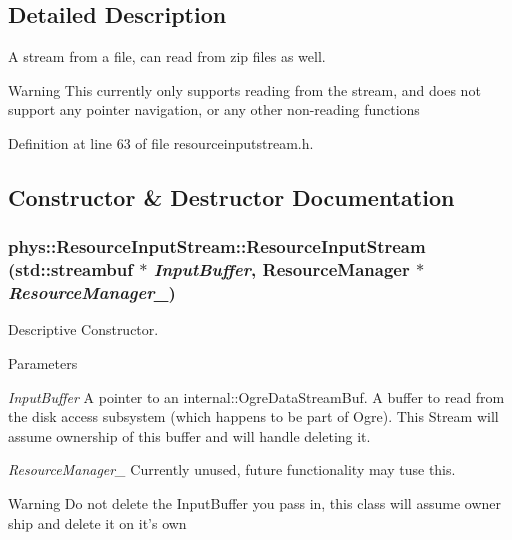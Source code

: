 \begin{DoxyCompactItemize}
\end{DoxyCompactItemize}


\subsection{Detailed Description}
A stream from a file, can read from zip files as well. \begin{DoxyWarning}{Warning}
This currently only supports reading from the stream, and does not support any pointer navigation, or any other non-\/reading functions 
\end{DoxyWarning}


Definition at line 63 of file resourceinputstream.h.



\subsection{Constructor \& Destructor Documentation}
\hypertarget{classphys_1_1ResourceInputStream_a890b739ac7f1c68108dc29f6887d2fa2}{
\subsubsection[{ResourceInputStream}]{\setlength{\rightskip}{0pt plus 5cm}phys::ResourceInputStream::ResourceInputStream (std::streambuf $\ast$ {\em InputBuffer}, \/  {\bf ResourceManager} $\ast$ {\em ResourceManager\_\-})}}
\label{dc/d52/classphys_1_1ResourceInputStream_a890b739ac7f1c68108dc29f6887d2fa2}


Descriptive Constructor. 


\begin{DoxyParams}{Parameters}
\item[{\em InputBuffer}]A pointer to an internal::OgreDataStreamBuf. A buffer to read from the disk access subsystem (which happens to be part of Ogre). This Stream will assume ownership of this buffer and will handle deleting it. \item[{\em ResourceManager\_\-}]Currently unused, future functionality may tuse this. \end{DoxyParams}
\begin{DoxyWarning}{Warning}
Do not delete the InputBuffer you pass in, this class will assume owner ship and delete it on it's own 
\end{DoxyWarning}


